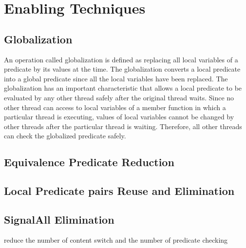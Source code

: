 \documentclass[10pt, conference, compsocconf]{IEEEtran}
\begin{document}
\section{Enabling Techniques}
\subsection{Globalization}
An operation called globalization is defined as replacing all local variables of
a predicate by its values at the time. The globalization converts a local 
predicate into a global predicate since all the local variables have been 
replaced. The globalization has an important characteristic that allows a
local predicate to be evaluated by any other thread safely after the original
thread waits. Since no other thread can access to local variables of a member 
function in which a particular thread is executing, values of local variables 
cannot be changed by other threads after the particular thread is waiting. 
Therefore, all other threads can check the globalized predicate safely. 


\subsection{Equivalence Predicate Reduction}

\subsection{Local Predicate pairs Reuse and Elimination}

\subsection{SignalAll Elimination}
reduce the number of content switch and the number of predicate checking 
\end{document}
